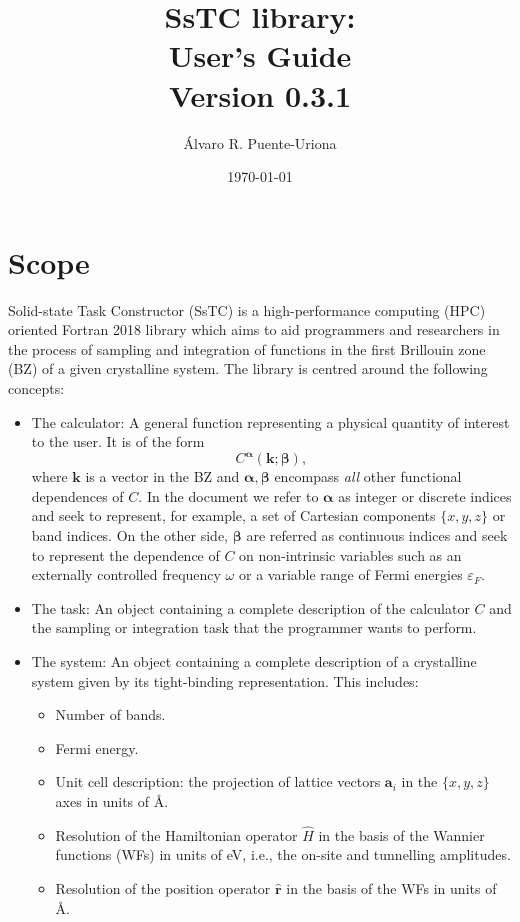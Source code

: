 \documentclass[10pt,a4paper]{article}
\title{SsTC library:\\
\large{User's Guide}\\
\large{Version 0.3.1}}
\author{Álvaro R. Puente-Uriona}
\date{\today}
\begin{document}
\maketitle
\tableofcontents
\clearpage
\newpage
\section{Scope}
Solid-state Task Constructor (SsTC) is a high-performance computing (HPC) oriented Fortran 2018 library which aims to aid programmers and researchers in the process of sampling and integration of functions in the first Brillouin zone (BZ) of a given crystalline system. The library is centred around the following concepts:
\begin{tcolorbox}\begin{itemize}
\item The calculator: A general function representing a physical quantity of interest to the user. It is of the form
\begin{equation}\label{eq:calculator}
C^{\bm{\alpha}}(\bm{k}; \bm{\beta}),
\end{equation}
where $\bm{k}$ is a vector in the BZ and $\bm{\alpha}, \bm{\beta}$ encompass \textit{all} other functional dependences of $C$. In the document we refer to $\bm{\alpha}$ as integer or discrete indices and seek to represent, for example, a set of Cartesian components $\{x, y, z\}$ or band indices. On the other side, $\bm{\beta}$ are referred as continuous indices and seek to represent the dependence of $C$ on non-intrinsic variables such as an externally controlled frequency $\omega$ or a variable range of Fermi energies $\varepsilon_F$.
\item The task: An object containing a complete description of the calculator $C$ and the sampling or integration task that the programmer wants to perform.
\item The system: An object containing a complete description of a crystalline system given by its tight-binding \cite{marzariMaximallyLocalizedWannier2012} representation. This includes:
\begin{tcolorbox}\begin{itemize}
\item Number of bands.
\item Fermi energy.
\item Unit cell description: the projection of lattice vectors $\bm{a}_i$ in the $\{x, y, z\}$ axes in units of \r{A}.
\item Resolution of the Hamiltonian operator $\hat{H}$ in the basis of the Wannier functions (WFs) \cite{marzariMaximallyLocalizedWannier2012} in units of eV, i.e., the on-site and tunnelling amplitudes.
\item Resolution of the position operator $\hat{\bm{r}}$ in the basis of the WFs in units of \r{A}.
\end{itemize}\end{tcolorbox}
\end{itemize}
\end{tcolorbox}
\end{document}
